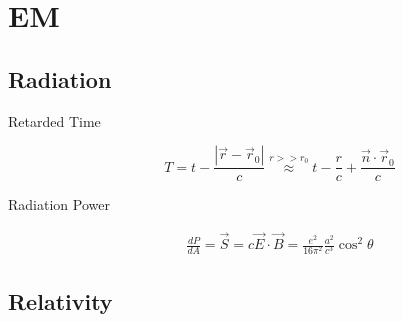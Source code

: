 \section{EM}

\subsection{Radiation}
\begin{description}
    \item [Retarded Time] 
	\begin{equation}
	    \label{eqn:em::retardedTime}
	    T = t-\frac{|\vec{r} - \vec{r}_0|}{c} \stackrel{r>>r_0}{\approx} t - \frac{r}{c} + \frac{\vec{n}\cdot\vec{r}_0}{c}
	\end{equation}


    \item [Radiation Power]
	\begin{equation}
	    \label{eqn:em::radiationPower}
	    \begin{gathered}
		\frac{dP}{dA} = \vec{S} = c\vec{E}\cdot\vec{B} = \frac{e^2}{16\pi^2}\frac{a^2}{c^3}\cos^2{\theta}
	    \end{gathered}
	\end{equation}
\end{description}

\subsection{Relativity}
